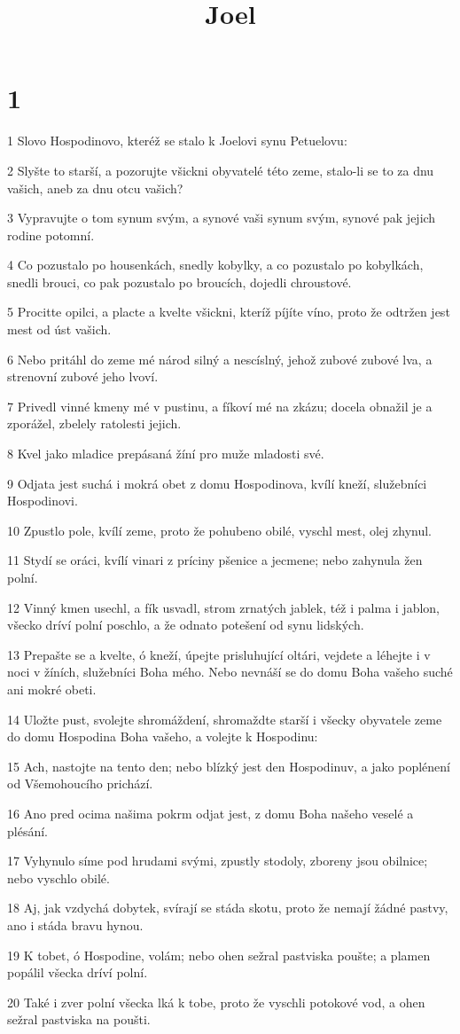 

\title{Joel}

\chapter{1}

\par 1 Slovo Hospodinovo, kteréž se stalo k Joelovi synu Petuelovu:
\par 2 Slyšte to starší, a pozorujte všickni obyvatelé této zeme, stalo-li se to za dnu vašich, aneb za dnu otcu vašich?
\par 3 Vypravujte o tom synum svým, a synové vaši synum svým, synové pak jejich rodine potomní.
\par 4 Co pozustalo po housenkách, snedly kobylky, a co pozustalo po kobylkách, snedli brouci, co pak pozustalo po broucích, dojedli chroustové.
\par 5 Procitte opilci, a placte a kvelte všickni, kteríž píjíte víno, proto že odtržen jest mest od úst vašich.
\par 6 Nebo pritáhl do zeme mé národ silný a nescíslný, jehož zubové zubové lva, a strenovní zubové jeho lvoví.
\par 7 Privedl vinné kmeny mé v pustinu, a fíkoví mé na zkázu; docela obnažil je a zporážel, zbelely ratolesti jejich.
\par 8 Kvel jako mladice prepásaná žíní pro muže mladosti své.
\par 9 Odjata jest suchá i mokrá obet z domu Hospodinova, kvílí kneží, služebníci Hospodinovi.
\par 10 Zpustlo pole, kvílí zeme, proto že pohubeno obilé, vyschl mest, olej zhynul.
\par 11 Stydí se oráci, kvílí vinari z príciny pšenice a jecmene; nebo zahynula žen polní.
\par 12 Vinný kmen usechl, a fík usvadl, strom zrnatých jablek, též i palma i jablon, všecko dríví polní poschlo, a že odnato potešení od synu lidských.
\par 13 Prepašte se a kvelte, ó kneží, úpejte prisluhující oltári, vejdete a léhejte i v noci v žíních, služebníci Boha mého. Nebo nevnáší se do domu Boha vašeho suché ani mokré obeti.
\par 14 Uložte pust, svolejte shromáždení, shromaždte starší i všecky obyvatele zeme do domu Hospodina Boha vašeho, a volejte k Hospodinu:
\par 15 Ach, nastojte na tento den; nebo blízký jest den Hospodinuv, a jako poplénení od Všemohoucího prichází.
\par 16 Ano pred ocima našima pokrm odjat jest, z domu Boha našeho veselé a plésání.
\par 17 Vyhynulo síme pod hrudami svými, zpustly stodoly, zboreny jsou obilnice; nebo vyschlo obilé.
\par 18 Aj, jak vzdychá dobytek, svírají se stáda skotu, proto že nemají žádné pastvy, ano i stáda bravu hynou.
\par 19 K tobet, ó Hospodine, volám; nebo ohen sežral pastviska poušte; a plamen popálil všecka dríví polní.
\par 20 Také i zver polní všecka lká k tobe, proto že vyschli potokové vod, a ohen sežral pastviska na poušti.

